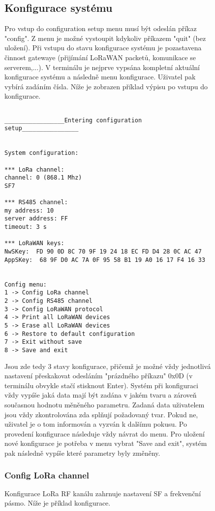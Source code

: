 \begin{figure}[!h]
\subsection{Konfigurace systému}
Pro vstup do configuration setup menu musí být odeslán příkaz "config". Z menu je možné vystoupit kdykoliv příkazem "quit" (bez uložení). 
Při vstupu do stavu konfigurace systému je pozastavena činnost gatewaye (přijímání LoRaWAN packetů, komunikace se serverem,...).
V terminálu je nejprve vypsána kompletní aktuální konfigurace systému a následně menu konfigurace. Uživatel pak vybírá zadáním čísla.
Níže je zobrazen příklad výpisu po vstupu do konfigurace.
\\

\begin{lstlisting}

_________________Entering configuration setup________________


System configuration:

*** LoRa channel: 
channel: 0 (868.1 Mhz)
SF7

*** RS485 channel: 
my address: 10
server address: FF
timeout: 3 s

*** LoRaWAN keys: 
NwSKey:  FD 90 0D 8C 70 9F 19 24 18 EC FD D4 28 0C AC 47
AppSKey:  68 9F D0 AC 7A 0F 95 58 B1 19 A0 16 17 F4 16 33


Config menu:
1 -> Config LoRa channel
2 -> Config RS485 channel
3 -> Config LoRaWAN protocol
4 -> Print all LoRaWAN devices
5 -> Erase all LoRaWAN devices
6 -> Restore to default configuration
7 -> Exit without save
8 -> Save and exit
\end{lstlisting}



Jsou zde tedy 3 stavy konfigurace, přičemž je možné vždy jednotlivá nastavení přeskakovat odesláním "prázdného příkazu" 0x0D (v terminálu obvykle stačí stisknout Enter). Systém při konfiguraci vždy vypíše jaká data mají být zadána v jakém tvaru a zároveň současnou hodnotu měněného parametru. Zadaná data uživatelem jsou vždy zkontrolována zda splňují požadovaný tvar. Pokud ne, uživatel je o tom informován a vyzván k dalšímu pokusu.
Po provedení konfigurace následuje vždy návrat do menu. Pro uložení nové konfigurace je potřeba v menu vybrat "Save and exit", systém pak následně vypíše které parametry byly změněny.

\subsubsection{Config LoRa channel}
Konfigurace LoRa RF kanálu zahrnuje nastavení SF a frekvenční pásmo. Níže je příklad konfigurace.


\end{figure}
